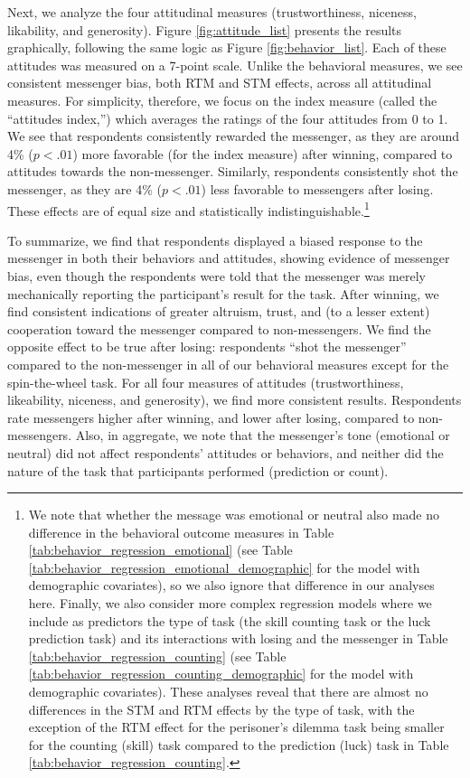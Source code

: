 Next, we analyze the four attitudinal measures (trustworthiness, niceness,
likability, and generosity). Figure \ref{fig:attitude_list} presents the results
graphically, following the same logic as Figure \ref{fig:behavior_list}. Each of
these attitudes was measured on a 7-point scale. Unlike the behavioral measures,
we see consistent messenger bias, both RTM and STM effects, across all
attitudinal measures. For simplicity, therefore, we focus on the index measure
(called the ``attitudes index,'') which averages the ratings of the four
attitudes from 0 to 1. We see that respondents consistently rewarded the
messenger, as they are around 4\% ($p < .01$) more favorable (for the index
measure) after winning, compared to attitudes towards the non-messenger.
Similarly, respondents consistently shot the messenger, as they are 4\% ($p < .
01$) less favorable to messengers after losing. These effects are of equal size
and statistically indistinguishable.\footnote{We note that whether the message
was emotional or neutral also made no difference in the behavioral outcome
measures in Table \ref{tab:behavior_regression_emotional} 
(see Table \ref{tab:behavior_regression_emotional_demographic} for the model with demographic
covariates), so we also ignore that difference in our analyses here. Finally, we
also consider more complex regression models where we include as predictors the
type of task (the skill counting task or the luck prediction task) and its
interactions with losing and the messenger in Table \ref{tab:behavior_regression_counting} 
(see Table \ref{tab:behavior_regression_counting_demographic} 
for the model with demographic
covariates). These analyses reveal that there are almost no differences in the
STM and RTM effects by the type of task, with the exception of the RTM effect
for the perisoner's dilemma task being smaller for the counting (skill) task compared to the
prediction (luck) task in Table \ref{tab:behavior_regression_counting}.}

To summarize, we find that respondents displayed a biased response to
the messenger in both their behaviors and attitudes, showing evidence of
messenger bias, even though the respondents were told that the
messenger was merely mechanically reporting the participant's result for
the task. After winning, we find consistent indications of greater
altruism, trust, and (to a lesser extent) cooperation toward the
messenger compared to non-messengers. We find the opposite effect to be
true after losing: respondents ``shot the messenger'' compared to the
non-messenger in all of our behavioral measures except for the
spin-the-wheel task. For all four measures of attitudes
(trustworthiness, likeability, niceness, and generosity), we find more
consistent results. Respondents rate messengers higher after winning, and
lower after losing, compared to non-messengers. Also, in aggregate, we
note that the messenger's tone (emotional or neutral) did not affect
respondents' attitudes or behaviors, and neither did the nature of the
task that participants performed (prediction or count).

